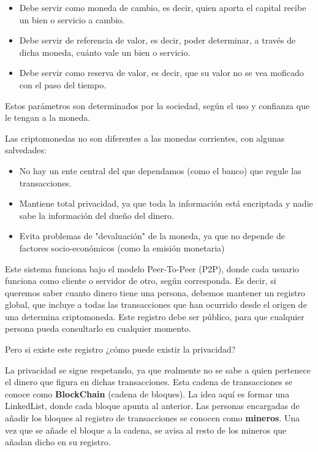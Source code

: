 \documentclass[a4paper,10pt]{article}
\begin{document}
\begin{itemize}
 \item Debe servir como moneda de cambio, es decir, quien aporta el capital recibe un bien o servicio a cambio.
 \item Debe servir de referencia de valor, es decir, poder determinar, a través de dicha moneda, cuánto vale un bien o servicio.
 \item Debe servir como reserva de valor, es decir, que su valor no se vea moficado con el paso del tiempo.
\end{itemize}

Estos parámetros son determinados por la sociedad, según el uso y confianza que le tengan a la moneda.

Las criptomonedas no son diferentes a las monedas corrientes, con algunas salvedades:

\begin{itemize}
 \item No hay un ente central del que dependamos (como el banco) que regule las transacciones.

 \item Mantiene total privacidad, ya que toda la información está encriptada y nadie sabe la información del dueño del dinero.

 \item Evita problemas de "devaluación" de la moneda, ya que no depende de factores socio-económicos (como la emisión monetaria)
\end{itemize}

Este sistema funciona bajo el modelo Peer-To-Peer (P2P), donde cada usuario funciona como cliente o servidor de otro, según corresponda. Es decir, si queremos saber cuanto dinero tiene una persona, debemos mantener un registro global, que incluye a todas las transacciones que han ocurrido desde el origen de una determina criptomoneda. Este registro debe ser público, para que cualquier persona pueda consultarlo en cualquier momento.

Pero si existe este registro ¿cómo puede existir la privacidad?

La privacidad se sigue respetando, ya que realmente no se sabe a quien pertenece el dinero que figura en dichas transacciones. Esta cadena de transacciones se conoce como \textbf{BlockChain} (cadena de bloques). La idea aquí es formar una LinkedList, donde cada bloque apunta al anterior.
Las personas encargadas de añadir los bloques al registro de transacciones se conocen como \textbf{mineros}. Una vez que se añade el bloque a la cadena, se avisa al resto de los mineros que añadan dicho en su registro.
\end{document}
